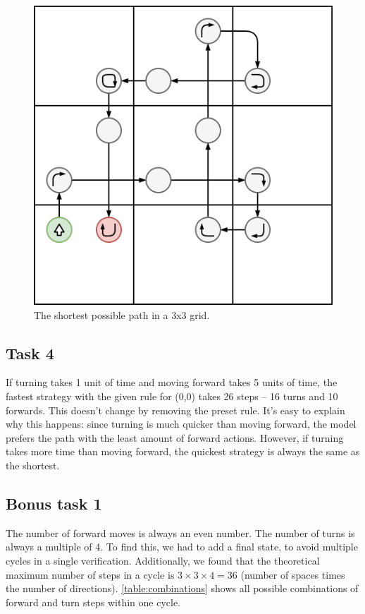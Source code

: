 \documentclass[11pt]{article}
\begin{document}
\begin{figure}[!htbp]
\centering
\includegraphics[scale=0.3]{vacuum3x3.png}
\caption{The shortest possible path in a 3x3 grid.}
\label{fig:vacuum3x3}
\end{figure}

\subsection*{Task 4}

If turning takes 1 unit of time and moving forward takes 5 units of time, the fastest strategy with the given rule for (0,0) takes 26 steps -- 16 turns and 10 forwards.
This doesn't change by removing the preset rule.
It's easy to explain why this happens: since turning is much quicker than moving forward, the model prefers the path with the least amount of forward actions.
However, if turning takes more time than moving forward, the quickest strategy is always the same as the shortest.

\subsection*{Bonus task 1}

The number of forward moves is always an even number.
The number of turns is always a multiple of 4.
To find this, we had to add a final state, to avoid multiple cycles in a single verification.
Additionally, we found that the theoretical maximum number of steps in a cycle is $3\times3\times4=36$ (number of spaces times the number of directions).
\autoref{table:combinations} shows all possible combinations of forward and turn steps within one cycle.
\end{document}
